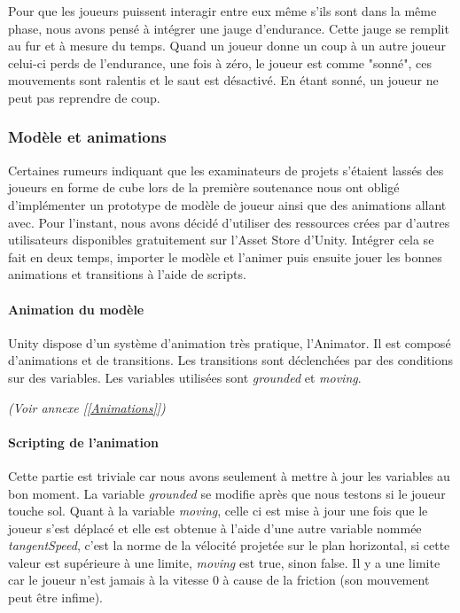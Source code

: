 \documentclass{article}
\begin{document}
Pour que les joueurs puissent interagir entre eux même s'ils sont dans la même phase, nous avons pensé à intégrer une jauge d'endurance. Cette jauge se remplit au fur et à mesure du temps. Quand un joueur donne un coup à un autre joueur celui-ci perds de l'endurance, une fois à zéro, le joueur est comme "sonné", ces mouvements sont ralentis et le saut est désactivé. En étant sonné, un joueur ne peut pas reprendre de coup.

\newpage
\subsubsection{Modèle et animations}

Certaines rumeurs indiquant que les examinateurs de projets s'étaient lassés des joueurs en forme de cube lors de la première soutenance nous ont obligé d'implémenter un prototype de modèle de joueur ainsi que des animations allant avec. Pour l'instant, nous avons décidé d'utiliser des ressources crées par d'autres utilisateurs disponibles gratuitement sur l'Asset Store d'Unity. Intégrer cela se fait en deux temps, importer le modèle et l'animer puis ensuite jouer les bonnes animations et transitions à l'aide de scripts.

\paragraph{Animation du modèle}

Unity dispose d'un système d'animation très pratique, l'Animator. Il est composé d'animations et de transitions. Les transitions sont déclenchées par des conditions sur des variables. Les variables utilisées sont \emph{grounded} et \emph{moving}.

\emph{(Voir annexe [\ref{Animations}])}

\paragraph{Scripting de l'animation}

Cette partie est triviale car nous avons seulement à mettre à jour les variables au bon moment. La variable \emph{grounded} se modifie après que nous testons si le joueur touche sol. Quant à la variable \emph{moving}, celle ci est mise à jour une fois que le joueur s'est déplacé et elle est obtenue à l'aide d'une autre variable nommée \emph{tangentSpeed}, c'est la norme de la vélocité projetée sur le plan horizontal, si cette valeur est supérieure à une limite, \emph{moving} est true, sinon false. Il y a une limite car le joueur n'est jamais à la vitesse 0 à cause de la friction (son mouvement peut être infime).
\end{document}
